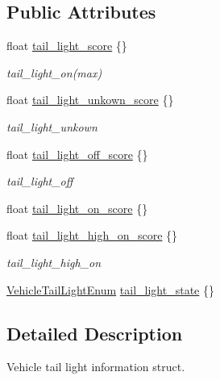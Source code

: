 \subsection*{Public Attributes}
\begin{DoxyCompactItemize}
\item 
float \hyperlink{structmaf__perception__interface_1_1VehicleTailLightInfo_a4e00edd24e99bbbcceaf216e4cd49492}{tail\+\_\+light\+\_\+score} \{\}
\begin{DoxyCompactList}\small\item\em tail\+\_\+light\+\_\+on(max) \end{DoxyCompactList}\item 
float \hyperlink{structmaf__perception__interface_1_1VehicleTailLightInfo_adf1cf7caab9aa2d9ceb6c0f2cf45b73f}{tail\+\_\+light\+\_\+unkown\+\_\+score} \{\}
\begin{DoxyCompactList}\small\item\em tail\+\_\+light\+\_\+unkown \end{DoxyCompactList}\item 
float \hyperlink{structmaf__perception__interface_1_1VehicleTailLightInfo_aaa465f2c3e55207272590a9a1fb044ff}{tail\+\_\+light\+\_\+off\+\_\+score} \{\}
\begin{DoxyCompactList}\small\item\em tail\+\_\+light\+\_\+off \end{DoxyCompactList}\item 
float \hyperlink{structmaf__perception__interface_1_1VehicleTailLightInfo_a6099f01fa616ff2a1415756e43d20a25}{tail\+\_\+light\+\_\+on\+\_\+score} \{\}
\item 
float \hyperlink{structmaf__perception__interface_1_1VehicleTailLightInfo_ac72dc462a8c6495613f64e38addc152e}{tail\+\_\+light\+\_\+high\+\_\+on\+\_\+score} \{\}
\begin{DoxyCompactList}\small\item\em tail\+\_\+light\+\_\+high\+\_\+on \end{DoxyCompactList}\item 
\hyperlink{structmaf__perception__interface_1_1VehicleTailLightEnum}{Vehicle\+Tail\+Light\+Enum} \hyperlink{structmaf__perception__interface_1_1VehicleTailLightInfo_a3b71ccd0e10f77a38c634320e279812b}{tail\+\_\+light\+\_\+state} \{\}
\end{DoxyCompactItemize}


\subsection{Detailed Description}
Vehicle tail light information struct. 

